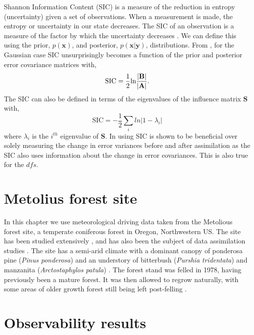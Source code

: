 Shannon Information Content (SIC) is a measure of the reduction in entropy (uncertainty) given a set of observations. When a measurement is made, the entropy or uncertainty in our state decreases. The SIC of an observation is a measure of the factor by which the uncertainty decreases \citep{cover1991elements}. We can define this using the prior, $p(\textbf{x})$, and posterior, $p(\textbf{x}|\textbf{y})$, distributions. From \citet{rodgers2000inverse}, for the Gaussian case SIC unsurprisingly becomes a function of the prior and posterior error covariance matrices with,
\begin{equation}
\text{SIC}=\frac{1}{2}\text{ln}\frac{| \bf{B} |}{| \bf{A} |}. \label{chap5:eqn:sic}
\end{equation}
The SIC can also be defined in terms of the eigenvalues of the influence matrix $\textbf{S}$ with,
\begin{equation}
\text{SIC} = -\frac{1}{2} \sum_{i} ln | 1 - \lambda_{i} |
\end{equation}
where $\lambda_{i}$ is the $i^{th}$ eigenvalue of $\textbf{S}$. In \citet{eyre1990information} using SIC is shown to be beneficial over solely measuring the change in error variances before and after assimilation as the SIC also uses information about the change in error covariances. This is also true for the $dfs$.   

\section{Metolius forest site} \label{chap5:sec:oregon}
In this chapter we use meteorological driving data taken from the Metolious forest site, a temperate coniferous forest in Oregon, Northwestern US. The site has been studied extensively \citep{law2001carbon}, and has also been the subject of data assimilation studies \citep{williams2005improved, Quaife2008}. The site has a semi-arid climate with a dominant canopy of ponderosa pine (\textit{Pinus ponderosa}) and an understory of bitterbush (\textit{Purshia tridentata}) and manzanita (\textit{Arctostaphylos patula}) \citep{law2001estimation}. The forest stand was felled in 1978, having previously been a mature forest. It was then allowed to regrow naturally, with some areas of older growth forest still being left post-felling \citep{williams2005improved}.

\section{Observability results}

